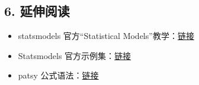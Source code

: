 \subsection{6. 延伸阅读}\label{ux5ef6ux4f38ux9605ux8bfb-33}

\begin{itemize}
\tightlist
\item
  statsmodels 官方``Statistical
  Models''教学：\href{https://www.statsmodels.org/stable/user-guide.html}{链接}
\item
  Statsmodels
  官方示例集：\href{https://www.statsmodels.org/stable/examples/index.html}{链接}
\item
  patsy
  公式语法：\href{https://patsy.readthedocs.io/en/latest/formulas.html}{链接}
\end{itemize}

\newpage
